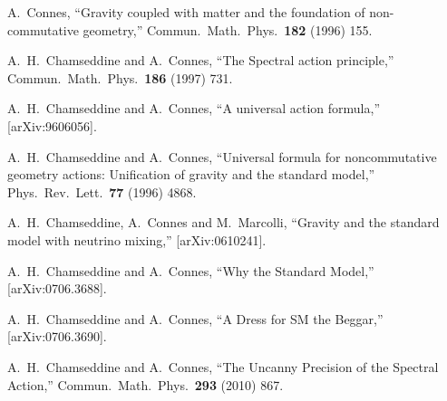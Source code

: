 \documentclass[letterpaper,11pt]{article}
\begin{document}
\begin{thebibliography}{99}






A.~Connes,
``Gravity coupled with matter and the foundation of non-commutative
geometry,''
Commun.\ Math.\ Phys.\  {\bf 182} (1996) 155.



  A.~H.~Chamseddine and A.~Connes,
  ``The Spectral action principle,''
  Commun.\ Math.\ Phys.\  {\bf 186} (1997) 731.



 
A.~H.~Chamseddine and A.~Connes,
``A universal action formula,''
[arXiv:9606056].




A.~H.~Chamseddine and A.~Connes,
``Universal formula for noncommutative geometry actions: Unification of
gravity and the standard model,''
Phys.\ Rev.\ Lett.\  {\bf 77} (1996) 4868.








  A.~H.~Chamseddine, A.~Connes and M.~Marcolli,
  ``Gravity and the standard model with neutrino mixing,''
  [arXiv:0610241].

  A.~H.~Chamseddine and A.~Connes,
  ``Why the Standard Model,''
  [arXiv:0706.3688].

  A.~H.~Chamseddine and A.~Connes,
  ``A Dress for SM the Beggar,''
  [arXiv:0706.3690].




  A.~H.~Chamseddine and A.~Connes,
  ``The Uncanny Precision of the Spectral Action,''
  Commun.\ Math.\ Phys.\  {\bf 293} (2010) 867.




\end{thebibliography}
\end{document}
